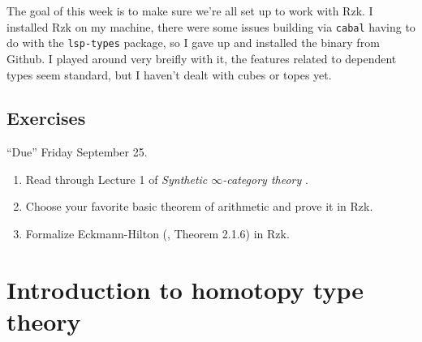 \documentclass[10pt]{article}
\begin{document}
The goal of this week is to make sure we're all set up to work with Rzk.
I installed Rzk on my machine, there were some issues building via \texttt{cabal} having to do with the \texttt{lsp-types} package, so I gave up and installed the binary from Github.
I played around very breifly with it, the features related to dependent types seem standard, but I haven't dealt with cubes or topes yet.

\subsection*{Exercises}

\enquote{Due} Friday September 25.

\begin{enumerate}
\item Read through Lecture 1 of \textit{Synthetic $\infty$-category theory} \cite{weinberger-2026}.
\item Choose your favorite basic theorem of arithmetic and prove it in Rzk.
\item Formalize Eckmann-Hilton (\cite{hottbook}, Theorem 2.1.6) in Rzk.
\end{enumerate}

\section{Introduction to homotopy type theory}

\nocite{*}


\end{document}
